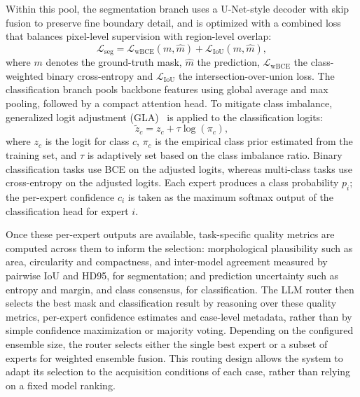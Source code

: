 \documentclass[fleqn,10pt]{wlscirep}
\begin{document}
Within this pool, the segmentation branch uses a U-Net-style decoder with skip fusion to preserve fine boundary detail, and is optimized with a combined loss that balances pixel-level supervision with region-level overlap:
\[
\mathcal{L}_{\text{seg}} = \mathcal{L}_{\text{wBCE}}(m, \hat{m}) + \mathcal{L}_{\text{IoU}}(m, \hat{m}),
\]
where $m$ denotes the ground-truth mask, $\hat{m}$ the prediction, $\mathcal{L}_{\text{wBCE}}$ the class-weighted binary cross-entropy and $\mathcal{L}_{\text{IoU}}$ the intersection-over-union loss. The classification branch pools backbone features using global average and max pooling, followed by a compact attention head. To mitigate class imbalance, generalized logit adjustment (GLA)~\cite{menon2020long} is applied to the classification logits:
\[
\tilde{z}_c = z_c + \tau\log(\pi_c),
\]
where $z_c$ is the logit for class $c$, $\pi_c$ is the empirical class prior estimated from the training set, and $\tau$ is adaptively set based on the class imbalance ratio. Binary classification tasks use BCE on the adjusted logits, whereas multi-class tasks use cross-entropy on the adjusted logits. Each expert produces a class probability $p_i$; the per-expert confidence $c_i$ is taken as the maximum softmax output of the classification head for expert $i$.

Once these per-expert outputs are available, task-specific quality metrics are computed across them to inform the selection: morphological plausibility such as area, circularity and compactness, and inter-model agreement measured by pairwise IoU and HD95, for segmentation; and prediction uncertainty such as entropy and margin, and class consensus, for classification. The LLM router then selects the best mask and classification result by reasoning over these quality metrics, per-expert confidence estimates and case-level metadata, rather than by simple confidence maximization or majority voting. Depending on the configured ensemble size, the router selects either the single best expert or a subset of experts for weighted ensemble fusion. This routing design allows the system to adapt its selection to the acquisition conditions of each case, rather than relying on a fixed model ranking.
\end{document}
